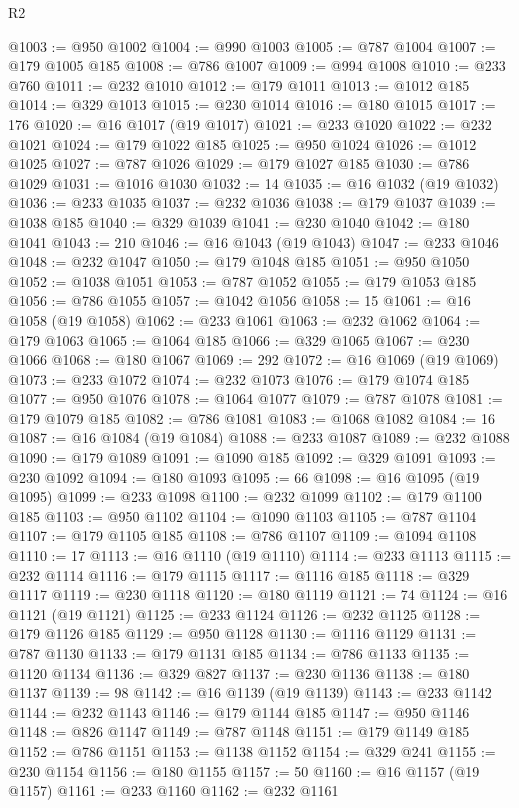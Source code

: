\begin{lexlean}{R2}
\begin{coremodule}
@1003 := @950 @1002
@1004 := @990 @1003
@1005 := @787 @1004
@1007 := @179 @1005 @185
@1008 := @786 @1007
@1009 := @994 @1008
@1010 := @233 @760
@1011 := @232 @1010
@1012 := @179 @1011
@1013 := @1012 @185
@1014 := @329 @1013
@1015 := @230 @1014
@1016 := @180 @1015
@1017 := 176
@1020 := @16 @1017 (@19 @1017)
@1021 := @233 @1020
@1022 := @232 @1021
@1024 := @179 @1022 @185
@1025 := @950 @1024
@1026 := @1012 @1025
@1027 := @787 @1026
@1029 := @179 @1027 @185
@1030 := @786 @1029
@1031 := @1016 @1030
@1032 := 14
@1035 := @16 @1032 (@19 @1032)
@1036 := @233 @1035
@1037 := @232 @1036
@1038 := @179 @1037
@1039 := @1038 @185
@1040 := @329 @1039
@1041 := @230 @1040
@1042 := @180 @1041
@1043 := 210
@1046 := @16 @1043 (@19 @1043)
@1047 := @233 @1046
@1048 := @232 @1047
@1050 := @179 @1048 @185
@1051 := @950 @1050
@1052 := @1038 @1051
@1053 := @787 @1052
@1055 := @179 @1053 @185
@1056 := @786 @1055
@1057 := @1042 @1056
@1058 := 15
@1061 := @16 @1058 (@19 @1058)
@1062 := @233 @1061
@1063 := @232 @1062
@1064 := @179 @1063
@1065 := @1064 @185
@1066 := @329 @1065
@1067 := @230 @1066
@1068 := @180 @1067
@1069 := 292
@1072 := @16 @1069 (@19 @1069)
@1073 := @233 @1072
@1074 := @232 @1073
@1076 := @179 @1074 @185
@1077 := @950 @1076
@1078 := @1064 @1077
@1079 := @787 @1078
@1081 := @179 @1079 @185
@1082 := @786 @1081
@1083 := @1068 @1082
@1084 := 16
@1087 := @16 @1084 (@19 @1084)
@1088 := @233 @1087
@1089 := @232 @1088
@1090 := @179 @1089
@1091 := @1090 @185
@1092 := @329 @1091
@1093 := @230 @1092
@1094 := @180 @1093
@1095 := 66
@1098 := @16 @1095 (@19 @1095)
@1099 := @233 @1098
@1100 := @232 @1099
@1102 := @179 @1100 @185
@1103 := @950 @1102
@1104 := @1090 @1103
@1105 := @787 @1104
@1107 := @179 @1105 @185
@1108 := @786 @1107
@1109 := @1094 @1108
@1110 := 17
@1113 := @16 @1110 (@19 @1110)
@1114 := @233 @1113
@1115 := @232 @1114
@1116 := @179 @1115
@1117 := @1116 @185
@1118 := @329 @1117
@1119 := @230 @1118
@1120 := @180 @1119
@1121 := 74
@1124 := @16 @1121 (@19 @1121)
@1125 := @233 @1124
@1126 := @232 @1125
@1128 := @179 @1126 @185
@1129 := @950 @1128
@1130 := @1116 @1129
@1131 := @787 @1130
@1133 := @179 @1131 @185
@1134 := @786 @1133
@1135 := @1120 @1134
@1136 := @329 @827
@1137 := @230 @1136
@1138 := @180 @1137
@1139 := 98
@1142 := @16 @1139 (@19 @1139)
@1143 := @233 @1142
@1144 := @232 @1143
@1146 := @179 @1144 @185
@1147 := @950 @1146
@1148 := @826 @1147
@1149 := @787 @1148
@1151 := @179 @1149 @185
@1152 := @786 @1151
@1153 := @1138 @1152
@1154 := @329 @241
@1155 := @230 @1154
@1156 := @180 @1155
@1157 := 50
@1160 := @16 @1157 (@19 @1157)
@1161 := @233 @1160
@1162 := @232 @1161

\end{coremodule}
\end{lexlean}
